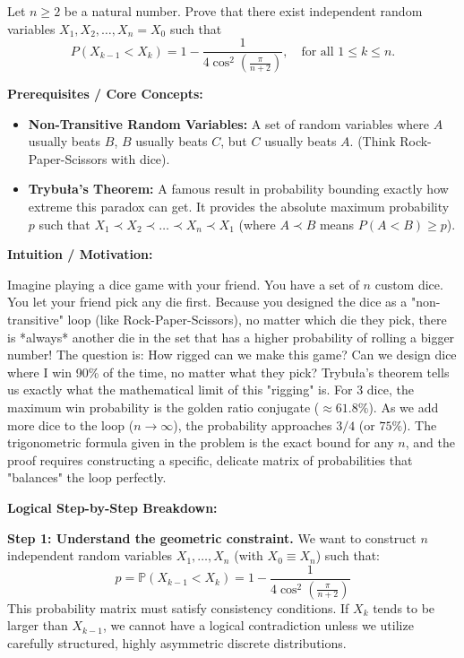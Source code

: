 \begin{exercise}\label{probability:2025:3}
Let $n \geq 2$ be a natural number. Prove that there exist independent random variables $X_1, X_2, \ldots, X_n = X_0$ such that
\[
P(X_{k-1} < X_k) = 1 - \frac{1}{4\cos^2\left(\frac{\pi}{n+2}\right)}, \quad \text{for all } 1 \leq k \leq n.
\]

\end{exercise}

\begin{solution}
\textbf{Prerequisites / Core Concepts:}
\begin{itemize}
    \item \textbf{Non-Transitive Random Variables:} A set of random variables where $A$ usually beats $B$, $B$ usually beats $C$, but $C$ usually beats $A$. (Think Rock-Paper-Scissors with dice).
    \item \textbf{Trybuła's Theorem:} A famous result in probability bounding exactly how extreme this paradox can get. It provides the absolute maximum probability $p$ such that $X_1 \prec X_2 \prec \dots \prec X_n \prec X_1$ (where $A \prec B$ means $P(A < B) \geq p$).
\end{itemize}

\textbf{Intuition / Motivation:}

Imagine playing a dice game with your friend. You have a set of $n$ custom dice.
You let your friend pick any die first. Because you designed the dice as a "non-transitive" loop (like Rock-Paper-Scissors), no matter which die they pick, there is *always* another die in the set that has a higher probability of rolling a bigger number!
The question is: How rigged can we make this game? Can we design dice where I win 90\% of the time, no matter what they pick?
Trybuła's theorem tells us exactly what the mathematical limit of this "rigging" is. For 3 dice, the maximum win probability is the golden ratio conjugate ($\approx 61.8\%$). As we add more dice to the loop ($n \to \infty$), the probability approaches $3/4$ (or $75\%$). The trigonometric formula given in the problem is the exact bound for any $n$, and the proof requires constructing a specific, delicate matrix of probabilities that "balances" the loop perfectly.

\textbf{Logical Step-by-Step Breakdown:}

\textbf{Step 1: Understand the geometric constraint.}
We want to construct $n$ independent random variables $X_1, \dots, X_n$ (with $X_0 \equiv X_n$) such that:
\[ p = \mathbb{P}(X_{k-1} < X_k) = 1 - \frac{1}{4\cos^2\left(\frac{\pi}{n+2}\right)} \]
This probability matrix must satisfy consistency conditions. If $X_k$ tends to be larger than $X_{k-1}$, we cannot have a logical contradiction unless we utilize carefully structured, highly asymmetric discrete distributions.


\end{solution}
